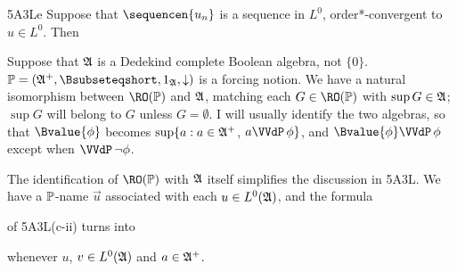 \spheader 5A3Le Suppose that $\sequencen{u_n}$ is a sequence in
$L^0$, order*-convergent to $u\in L^0$.
Then



Suppose that $\frak A$ is a Dedekind complete
Boolean algebra, not $\{0\}$.   
$\Bbb P=(\frak A^+,\Bsubseteqshort,1_{\frak A},\downarrow)$ is a forcing
notion.   We have a natural
isomorphism between $\RO(\Bbb P)$ and $\frak A$, matching
each $G\in\RO(\Bbb P)$ with $\sup G\in\frak A$;
 $\sup G$ will belong to $G$ unless
$G=\emptyset$.    I
will usually identify the two algebras, so that
$\Bvalue{\phi}$ becomes
$\sup\{a:a\in\frak A^+$, $a\VVdP\,\phi\}$,
and $\Bvalue{\phi}\VVdP\,\phi$ except when
$\VVdP\,\neg\phi$.

The identification of $\RO(\Bbb P)$ with $\frak A$ itself
simplifies the discussion in 5A3L.   We have a $\Bbb P$-name $\vec u$ associated
with each $u\in L^0(\frak A)$, and the formula


\noindent of 5A3L(c-ii) turns into


\noindent whenever $u$, $v\in L^0(\frak A)$ and $a\in\frak A^+$.  


